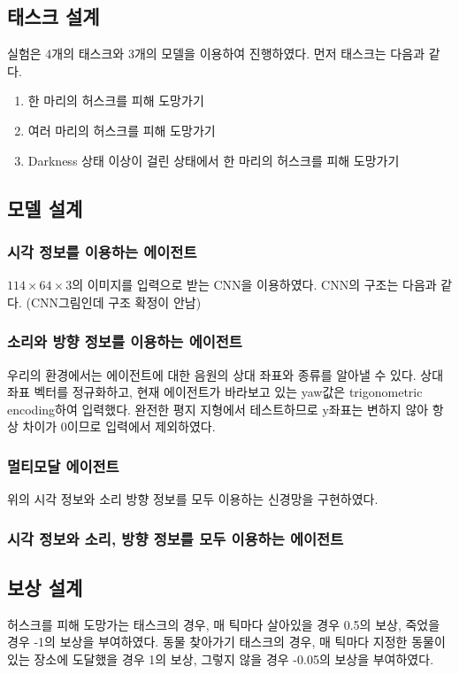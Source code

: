 \documentclass{tudelftposter}
\begin{document}
\subsection{태스크 설계}
실험은 4개의 태스크와 3개의 모델을 이용하여 진행하였다. 먼저 태스크는 다음과 같다.
\begin{enumerate}
  \item 한 마리의 허스크를 피해 도망가기
  \item 여러 마리의 허스크를 피해 도망가기
  \item Darkness 상태 이상이 걸린 상태에서 한 마리의 허스크를 피해 도망가기
\end{enumerate}

\subsection{모델 설계}
\subsubsection{시각 정보를 이용하는 에이전트}
$114 \times 64 \times 3$의 이미지를 입력으로 받는 CNN을 이용하였다. CNN의 구조는 다음과 같다.
(CNN그림인데 구조 확정이 안남)
\subsubsection{소리와 방향 정보를 이용하는 에이전트}
우리의 환경에서는 에이전트에 대한 음원의 상대 좌표와 종류를 알아낼 수 있다. 상대 좌표 벡터를 정규화하고, 현재 에이전트가 바라보고 있는 yaw값은 trigonometric encoding하여 입력했다. 완전한 평지 지형에서 테스트하므로 y좌표는 변하지 않아 항상 차이가 0이므로 입력에서 제외하였다. 

\subsubsection{멀티모달 에이전트}
위의 시각 정보와 소리 방향 정보를 모두 이용하는 신경망을 구현하였다.


\subsubsection{시각 정보와 소리, 방향 정보를 모두 이용하는 에이전트}

\subsection{보상 설계}
허스크를 피해 도망가는 태스크의 경우, 매 틱마다 살아있을 경우 0.5의 보상, 죽었을 경우 -1의 보상을 부여하였다. 동물 찾아가기 태스크의 경우, 매 틱마다 지정한 동물이 있는 장소에 도달했을 경우 1의 보상, 그렇지 않을 경우 -0.05의 보상을 부여하였다.
\end{document}
